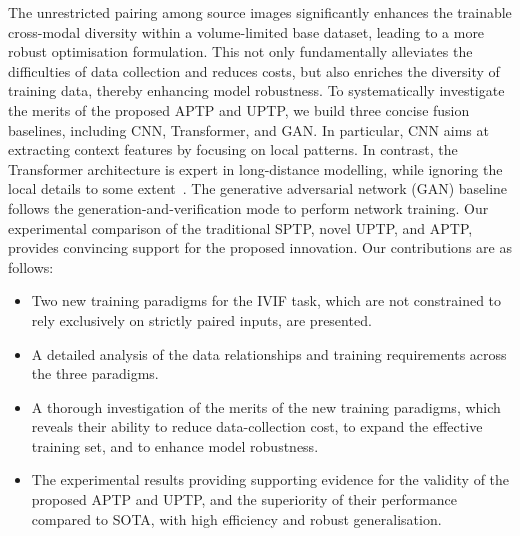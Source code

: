 The unrestricted pairing among source images significantly enhances the trainable cross-modal diversity within a volume-limited base dataset, leading to a more robust optimisation formulation.
This not only fundamentally alleviates the difficulties of data collection and reduces costs, but also enriches the diversity of training data, thereby enhancing model robustness.
To systematically investigate the merits of the proposed APTP and UPTP, we build three concise fusion baselines, including CNN, Transformer, and GAN. 
In particular, CNN aims at extracting context features by focusing on local patterns.
In contrast, the Transformer architecture is expert in long-distance modelling, while ignoring the local details to some extent~\cite{transformerconstrain}.
The generative adversarial network (GAN) baseline follows the generation-and-verification mode to perform network training.
Our experimental comparison of the traditional SPTP, novel UPTP, and APTP, provides convincing support for the proposed innovation. 
Our contributions are as follows:
\begin{itemize}
\item  Two new training paradigms for the IVIF task, which are not constrained to rely exclusively on strictly paired inputs, are presented.
\item A detailed analysis of the data relationships and training requirements across the three paradigms.  
\item  A thorough investigation of the merits of the new training paradigms, which reveals their ability to reduce data-collection cost, to expand the effective training set, and to enhance model robustness. 
\item The experimental results providing supporting evidence for the validity of the proposed APTP and UPTP, and the superiority of their performance compared to SOTA, with high efficiency and robust generalisation. 

\end{itemize}
